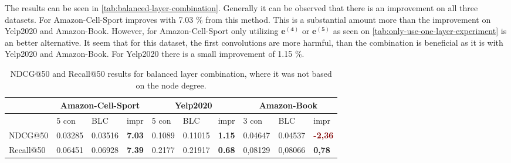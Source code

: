 The results can be seen in \autoref{tab:balanced-layer-combination}.
Generally it can be observed that there is an improvement on all three datasets. %
For Amazon-Cell-Sport improves with 7.03 \% from this method.
This is a substantial amount more than the improvement on Yelp2020 and Amazon-Book.
However, for Amazon-Cell-Sport only utilizing $\mathbf{e^{(4)}}$ or $\mathbf{e^{(5)}}$ as seen on \autoref{tab:only-use-one-layer-experiment} is an better alternative.
It seem that for this dataset, the first convolutions are more harmful, than the combination is beneficial as it is with Yelp2020 and Amazon-Book.
For Yelp2020 there is a small improvement of 1.15 \%.

\begin{table*}[h!] %
    \centering
    \begin{tabular}{|l|r|r|r||l|r|r||l|l|l|}
        \hline
                  & \multicolumn{3}{c||}{Amazon-Cell-Sport} & \multicolumn{3}{c||}{Yelp2020} & \multicolumn{3}{c|}{Amazon-Book}                                                                                                                                              \\ \hline
                  & \multicolumn{1}{l|}{5 con}              & \multicolumn{1}{l|}{BLC}       & \multicolumn{1}{l||}{impr}            & 5 con  & \multicolumn{1}{l|}{BLC} & \multicolumn{1}{l||}{impr}            & 3 con   & BLC     & impr                                  \\ \hline
        NDCG@50   & 0.03285                                 & 0.03516                        & \textbf{\textcolor{OliveGreen}{7.03}} & 0.1089 & 0.11015                  & \textbf{\textcolor{OliveGreen}{1.15}} & 0.04647 & 0.04537 & \textbf{\textcolor{Maroon}{-2,36}}    \\ \hline
        Recall@50 & 0.06451                                 & 0.06928                        & \textbf{\textcolor{OliveGreen}{7.39}} & 0.2177 & 0.21917                  & \textbf{\textcolor{OliveGreen}{0.68}} & 0,08129 & 0,08066 & \textbf{\textcolor{OliveGreen}{0,78}} \\ \hline
    \end{tabular}
    \caption{NDCG@50 and Recall@50 results for balanced layer combination, where it was not based on the node degree.}
    \label{tab:balanced-layer-combination}
\end{table*}

